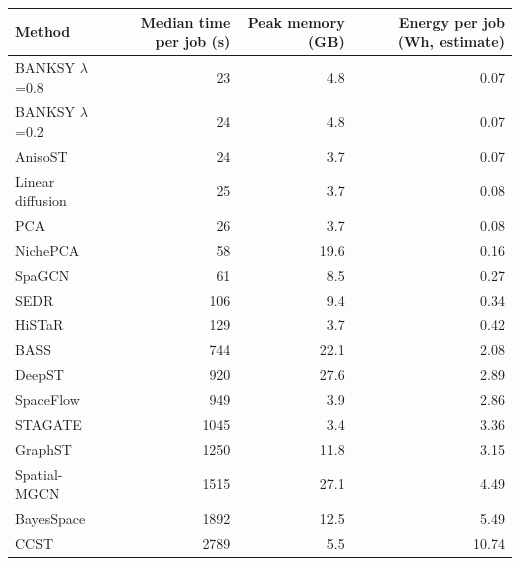 \footnotesize
\begin{tabular}{lrrr}
\toprule
Method & Median time per job (s) & Peak memory (GB) & Energy per job (Wh, estimate) \\
\midrule
BANKSY $\lambda$=0.8 & 23 & 4.8 & 0.07 \\
BANKSY $\lambda$=0.2 & 24 & 4.8 & 0.07 \\
AnisoST & 24 & 3.7 & 0.07 \\
Linear diffusion & 25 & 3.7 & 0.08 \\
PCA & 26 & 3.7 & 0.08 \\
NichePCA & 58 & 19.6 & 0.16 \\
SpaGCN & 61 & 8.5 & 0.27 \\
SEDR & 106 & 9.4 & 0.34 \\
HiSTaR & 129 & 3.7 & 0.42 \\
BASS & 744 & 22.1 & 2.08 \\
DeepST & 920 & 27.6 & 2.89 \\
SpaceFlow & 949 & 3.9 & 2.86 \\
STAGATE & 1045 & 3.4 & 3.36 \\
GraphST & 1250 & 11.8 & 3.15 \\
Spatial-MGCN & 1515 & 27.1 & 4.49 \\
BayesSpace & 1892 & 12.5 & 5.49 \\
CCST & 2789 & 5.5 & 10.74 \\
\bottomrule
\end{tabular}
